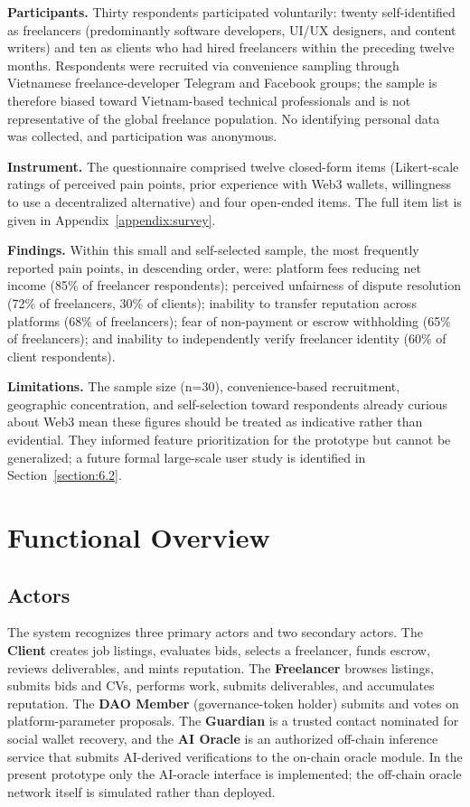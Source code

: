 \textbf{Participants.} Thirty respondents participated voluntarily: twenty self-identified as freelancers (predominantly software developers, UI/UX designers, and content writers) and ten as clients who had hired freelancers within the preceding twelve months. Respondents were recruited via convenience sampling through Vietnamese freelance-developer Telegram and Facebook groups; the sample is therefore biased toward Vietnam-based technical professionals and is not representative of the global freelance population. No identifying personal data was collected, and participation was anonymous.

\textbf{Instrument.} The questionnaire comprised twelve closed-form items (Likert-scale ratings of perceived pain points, prior experience with Web3 wallets, willingness to use a decentralized alternative) and four open-ended items. The full item list is given in Appendix~\ref{appendix:survey}.

\textbf{Findings.} Within this small and self-selected sample, the most frequently reported pain points, in descending order, were: platform fees reducing net income (85\% of freelancer respondents); perceived unfairness of dispute resolution (72\% of freelancers, 30\% of clients); inability to transfer reputation across platforms (68\% of freelancers); fear of non-payment or escrow withholding (65\% of freelancers); and inability to independently verify freelancer identity (60\% of client respondents).

\textbf{Limitations.} The sample size (n=30), convenience-based recruitment, geographic concentration, and self-selection toward respondents already curious about Web3 mean these figures should be treated as indicative rather than evidential. They informed feature prioritization for the prototype but cannot be generalized; a future formal large-scale user study is identified in Section~\ref{section:6.2}.

\section{Functional Overview}
\label{section:2.2}

\subsection{Actors}

The system recognizes three primary actors and two secondary actors. The \textbf{Client} creates job listings, evaluates bids, selects a freelancer, funds escrow, reviews deliverables, and mints reputation. The \textbf{Freelancer} browses listings, submits bids and CVs, performs work, submits deliverables, and accumulates reputation. The \textbf{DAO Member} (governance-token holder) submits and votes on platform-parameter proposals. The \textbf{Guardian} is a trusted contact nominated for social wallet recovery, and the \textbf{AI Oracle} is an authorized off-chain inference service that submits AI-derived verifications to the on-chain oracle module. In the present prototype only the AI-oracle interface is implemented; the off-chain oracle network itself is simulated rather than deployed.

